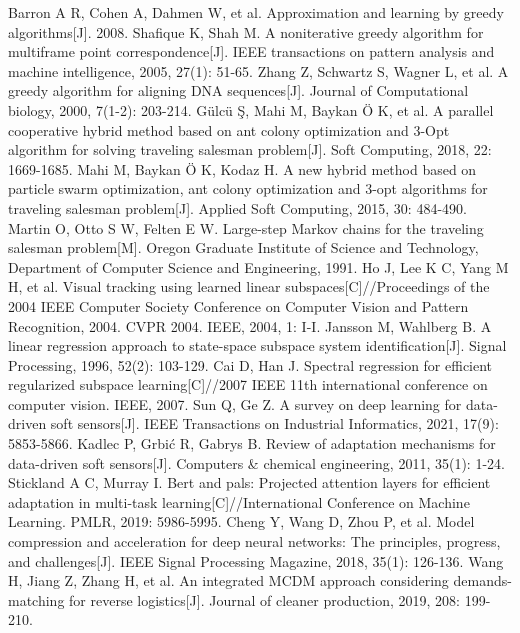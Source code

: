 \documentclass{NauThesis}
\begin{document}
\begin{thebibliography}{99}
Barron A R, Cohen A, Dahmen W, et al. Approximation and learning by greedy algorithms[J]. 2008.
Shafique K, Shah M. A noniterative greedy algorithm for multiframe point correspondence[J]. IEEE transactions on pattern analysis and machine intelligence, 2005, 27(1): 51-65.
Zhang Z, Schwartz S, Wagner L, et al. A greedy algorithm for aligning DNA sequences[J]. Journal of Computational biology, 2000, 7(1-2): 203-214.
Gülcü Ş, Mahi M, Baykan Ö K, et al. A parallel cooperative hybrid method based on ant colony optimization and 3-Opt algorithm for solving traveling salesman problem[J]. Soft Computing, 2018, 22: 1669-1685.
Mahi M, Baykan Ö K, Kodaz H. A new hybrid method based on particle swarm optimization, ant colony optimization and 3-opt algorithms for traveling salesman problem[J]. Applied Soft Computing, 2015, 30: 484-490.
Martin O, Otto S W, Felten E W. Large-step Markov chains for the traveling salesman problem[M]. Oregon Graduate Institute of Science and Technology, Department of Computer Science and Engineering, 1991.
Ho J, Lee K C, Yang M H, et al. Visual tracking using learned linear subspaces[C]//Proceedings of the 2004 IEEE Computer Society Conference on Computer Vision and Pattern Recognition, 2004. CVPR 2004. IEEE, 2004, 1: I-I.
Jansson M, Wahlberg B. A linear regression approach to state-space subspace system identification[J]. Signal Processing, 1996, 52(2): 103-129.
Cai D, Han J. Spectral regression for efficient regularized subspace learning[C]//2007 IEEE 11th international conference on computer vision. IEEE, 2007.
Sun Q, Ge Z. A survey on deep learning for data-driven soft sensors[J]. IEEE Transactions on Industrial Informatics, 2021, 17(9): 5853-5866.
Kadlec P, Grbić R, Gabrys B. Review of adaptation mechanisms for data-driven soft sensors[J]. Computers \& chemical engineering, 2011, 35(1): 1-24.
Stickland A C, Murray I. Bert and pals: Projected attention layers for efficient adaptation in multi-task learning[C]//International Conference on Machine Learning. PMLR, 2019: 5986-5995.
Cheng Y, Wang D, Zhou P, et al. Model compression and acceleration for deep neural networks: The principles, progress, and challenges[J]. IEEE Signal Processing Magazine, 2018, 35(1): 126-136.
Wang H, Jiang Z, Zhang H, et al. An integrated MCDM approach considering demands-matching for reverse logistics[J]. Journal of cleaner production, 2019, 208: 199-210.

\end{thebibliography}
\end{document}

